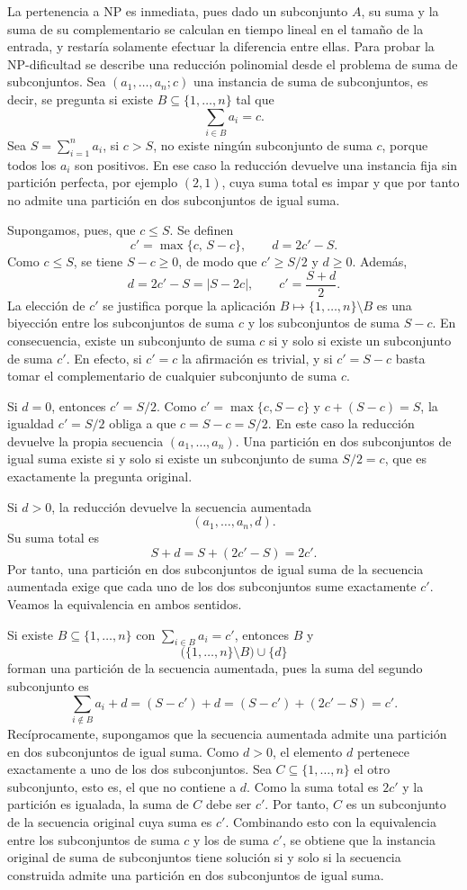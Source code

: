 \begin{demostracion}
	La pertenencia a NP es inmediata, pues dado un subconjunto $A$, su suma y la suma de su complementario se calculan en tiempo lineal en el tamaño de la entrada, y restaría solamente efectuar la diferencia entre ellas. Para probar la NP-dificultad se describe una reducción polinomial desde el problema de suma de subconjuntos. Sea $(a_1,\ldots,a_n;c)$ una instancia de suma de subconjuntos, es decir, se pregunta si existe $B\subseteq\{1,\ldots,n\}$ tal que
	\[
	\sum_{i\in B} a_i = c.
	\]
	Sea $S=\sum_{i=1}^n a_i$, si $c>S$, no existe ningún subconjunto de suma $c$, porque todos los $a_i$ son positivos. En ese caso la reducción devuelve una instancia fija sin partición perfecta, por ejemplo $(2,1)$, cuya suma total es impar y que por tanto no admite una partición en dos subconjuntos de igual suma.
	
	Supongamos, pues, que $c\leq S$. Se definen
	\[
	c'=\max\{c,\,S-c\},
	\qquad
	d=2c'-S.
	\]
	Como $c\leq S$, se tiene $S-c\geq 0$, de modo que $c'\geq S/2$ y $d\geq 0$. Además,
	\[
	d=2c'-S=|S-2c|,
	\qquad
	c'=\frac{S+d}{2}.
	\]
	La elección de $c'$ se justifica porque la aplicación $B\mapsto \{1,\ldots,n\}\setminus B$ es una biyección entre los subconjuntos de suma $c$ y los subconjuntos de suma $S-c$. En consecuencia, existe un subconjunto de suma $c$ si y solo si existe un subconjunto de suma $c'$. En efecto, si $c'=c$ la afirmación es trivial, y si $c'=S-c$ basta tomar el complementario de cualquier subconjunto de suma $c$.
	
	Si $d=0$, entonces $c'=S/2$. Como $c'=\max\{c,S-c\}$ y $c+(S-c)=S$, la igualdad $c'=S/2$ obliga a que $c=S-c=S/2$. En este caso la reducción devuelve la propia secuencia $(a_1,\ldots,a_n)$. Una partición en dos subconjuntos de igual suma existe si y solo si existe un subconjunto de suma $S/2=c$, que es exactamente la pregunta original.
	
	Si $d>0$, la reducción devuelve la secuencia aumentada
	\[
	(a_1,\ldots,a_n,d).
	\]
	Su suma total es
	\[
	S+d=S+(2c'-S)=2c'.
	\]
	Por tanto, una partición en dos subconjuntos de igual suma de la secuencia aumentada exige que cada uno de los dos subconjuntos sume exactamente $c'$. Veamos la equivalencia en ambos sentidos.
	
	Si existe $B\subseteq\{1,\ldots,n\}$ con $\sum_{i\in B}a_i=c'$, entonces $B$ y
	\[
	\bigl(\{1,\ldots,n\}\setminus B\bigr)\cup\{d\}
	\]
	forman una partición de la secuencia aumentada, pues la suma del segundo subconjunto es
	\[
	\sum_{i\notin B} a_i+d=(S-c')+d
	=(S-c')+(2c'-S)=c'.
	\]
	Recíprocamente, supongamos que la secuencia aumentada admite una partición en dos subconjuntos de igual suma. Como $d>0$, el elemento $d$ pertenece exactamente a uno de los dos subconjuntos. Sea $C\subseteq\{1,\ldots,n\}$ el otro subconjunto, esto es, el que no contiene a $d$. Como la suma total es $2c'$ y la partición es igualada, la suma de $C$ debe ser $c'$. Por tanto, $C$ es un subconjunto de la secuencia original cuya suma es $c'$. Combinando esto con la equivalencia entre los subconjuntos de suma $c$ y los de suma $c'$, se obtiene que la instancia original de suma de subconjuntos tiene solución si y solo si la secuencia construida admite una partición en dos subconjuntos de igual suma.
	

\end{demostracion}
